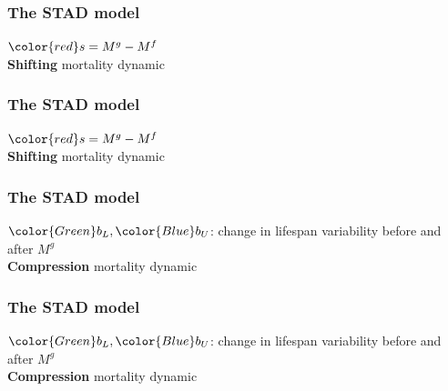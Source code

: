 \documentclass[12pt, xcolor=table]{beamer}  %
\begin{document}
\begin{frame}[noframenumbering]\frametitle{The STAD model}
\begin{center}
\vspace{-0.1cm}
${\color{red}s}=M^g - M^f$ \\
\textbf{Shifting} mortality dynamic \\
\end{center}

\end{frame}

\begin{frame}[noframenumbering]\frametitle{The STAD model}
\begin{center}
\vspace{-0.1cm}
${\color{red}s}=M^g - M^f$ \\
\textbf{Shifting} mortality dynamic \\
\end{center}

\end{frame}


\begin{frame}\frametitle{The STAD model}
\begin{center}
\vspace{-0.1cm}
${\color{Green}b_L} , {\color{Blue}b_U}$: change in lifespan variability before and after $M^g$ \\
\textbf{Compression} mortality dynamic \\
\end{center}

\end{frame}

\begin{frame}[noframenumbering]\frametitle{The STAD model}
\begin{center}
\vspace{-0.1cm}
${\color{Green}b_L} , {\color{Blue}b_U}$: change in lifespan variability before and after $M^g$ \\
\textbf{Compression} mortality dynamic \\
\end{center}

\end{frame}
\end{document}
